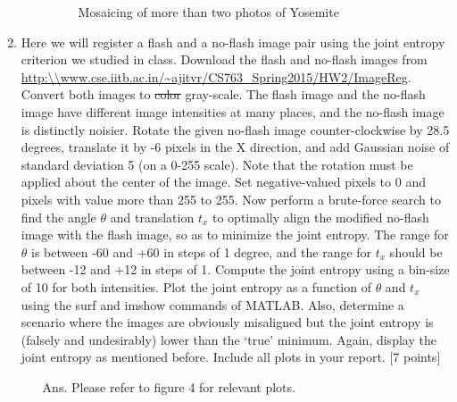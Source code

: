 \documentclass[11pt]{article}
\begin{document}
\begin{enumerate}
\begin{itemize}
\begin{figure}[!htb]
	\caption{Mosaicing of more than two photos of Yosemite}
\end{figure}
\end{itemize}
\item Here we will register a flash and a no-flash image pair using the joint entropy criterion we studied in class. Download the flash and no-flash images from \url{http:\\www.cse.iitb.ac.in/~ajitvr/CS763_Spring2015/HW2/ImageReg}. Convert both images to \sout{color} gray-scale. The flash image and the no-flash image have different image intensities at many places, and the no-flash image is distinctly noisier. Rotate the given no-flash image counter-clockwise by 28.5 degrees, translate it by -6 pixels in the X direction, and add Gaussian noise of standard deviation 5 (on a 0-255 scale). Note that the rotation must be applied about the center of the image. Set negative-valued pixels to 0 and pixels with value more than 255 to 255. Now perform a brute-force search to find the angle $\theta$ and translation $t_x$ to optimally align the modified no-flash image with the flash image, so as to minimize the joint entropy. The range for $\theta$ is between -60 and +60 in steps of 1 degree, and the range for $t_x$ should be between -12 and +12 in steps of 1. Compute the joint entropy using a bin-size of 10 for both intensities. Plot the joint entropy as a function of $\theta$ and $t_x$ using the surf and imshow commands of MATLAB. Also, determine a scenario where the images are obviously misaligned but the joint entropy is (falsely and undesirably) lower than the `true' minimum. Again, display the joint entropy as mentioned before. Include all plots in your report. \textsf{[7 points]} 
\begin{itemize}
\item[Ans.]
Please refer to figure 4 for relevant plots.
\begin{figure}[!htb]
    \centering
    \qquad

\end{figure}
\end{itemize}
\end{enumerate}
\end{document}
